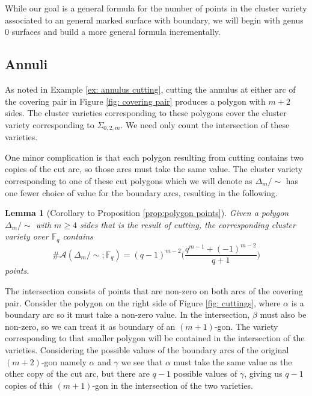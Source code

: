 \documentclass[reqno,12pt]{amsart}
\newtheorem{lemma}[thm]{Lemma}
\theoremstyle{definition}
\theoremstyle{remark}
\theoremstyle{remark}
\numberwithin{equation}{section}
\begin{document}
While our goal is a general formula for the number of points in the cluster variety associated to an general marked surface with boundary, we will begin with genus 0 surfaces and build a more general formula incrementally. 

\subsection{Annuli}

As noted in Example \ref{ex: annulus cutting}, cutting the annulus at either arc of the covering pair in Figure \ref{fig: covering pair} produces a polygon with $m+2$ sides. The cluster varieties corresponding to these polygons cover the cluster variety corresponding to $\Sigma_{0,2,m}$. We need only count the intersection of these varieties. 

One minor complication is that each polygon resulting from cutting contains two copies of the cut arc, so those arcs must take the same value. The cluster variety corresponding to one of these cut polygons \textemdash which we will denote as $\Delta_m/\!\sim $ \textemdash has one fewer choice of value for the boundary arcs, resulting in the following. 

\begin{lemma}[Corollary to Proposition \ref{prop:polygon points}]
Given a polygon $\Delta_m/\!\sim$ with $m\geq 4$ sides that is the result of cutting, the corresponding cluster variety over $\mathbb{F}_q$ contains \[ \#\mathcal{A}(\Delta_m/\!\sim; \mathbb{F}_q) = (q-1)^{m-2} \Bigg( \frac{q^{m-1} + (-1)^{m-2}}{q+1} \Bigg) \] 
points.
\end{lemma}

The intersection consists of points that are non-zero on both arcs of the covering pair. Consider the polygon on the right side of Figure \ref{fig: cuttings}, where $\alpha$ is  a boundary arc so it must take a non-zero value. In the intersection, $\beta$ must also be non-zero, so we can treat it as boundary of an $(m+1)$-gon. The variety corresponding to that smaller polygon will be contained in the intersection of the varieties. Considering the possible values of the boundary arcs of the original $(m+2)$-gon \textemdash namely $\alpha$ and $\gamma$ \textemdash we see that $\alpha$ must take the same value as the other copy of the cut arc, but there are $q-1$ possible values of $\gamma$, giving us $q-1$ copies of this $(m+1)$-gon in the intersection of the two varieties.
\end{document}
